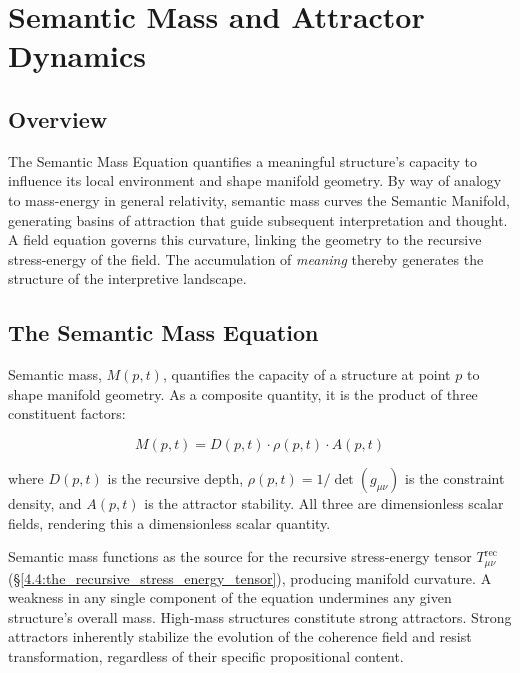 \chapter{Semantic Mass and Attractor Dynamics}
\label{5:semantic_mass_and_attractor_dynamics}


\section{Overview}
\label{5.1:overview}

The Semantic Mass Equation quantifies a meaningful structure's capacity to influence its local environment and shape manifold geometry. By way of analogy to mass-energy in general relativity, semantic mass curves the Semantic Manifold, generating basins of attraction that guide subsequent interpretation and thought. A field equation governs this curvature, linking the geometry to the recursive stress-energy of the field. The accumulation of \textit{meaning} thereby generates the structure of the interpretive landscape.


\section{The Semantic Mass Equation}
\label{5.2:the_semantic_mass_equation}

Semantic mass, \(M(p,t)\), quantifies the capacity of a structure at point \(p\) to shape manifold geometry. As a composite quantity, it is the product of three constituent factors:

\begin{equation}
M(p, t) = D(p, t) \cdot \rho(p, t) \cdot A(p, t)
\end{equation}

where \(D(p, t)\) is the recursive depth, \(\rho(p, t) = 1/\det(g_{\mu\nu})\) is the constraint density, and \(A(p, t)\) is the attractor stability. All three are dimensionless scalar fields, rendering this a dimensionless scalar quantity. 

Semantic mass functions as the source for the recursive stress-energy tensor \(T^{\text{rec}}_{\mu\nu}\) (\S\ref{4.4:the_recursive_stress_energy_tensor}), producing manifold curvature. A weakness in any single component of the equation undermines any given structure's overall mass. High-mass structures constitute strong attractors. Strong attractors inherently stabilize the evolution of the coherence field and resist transformation, regardless of their specific propositional content.

